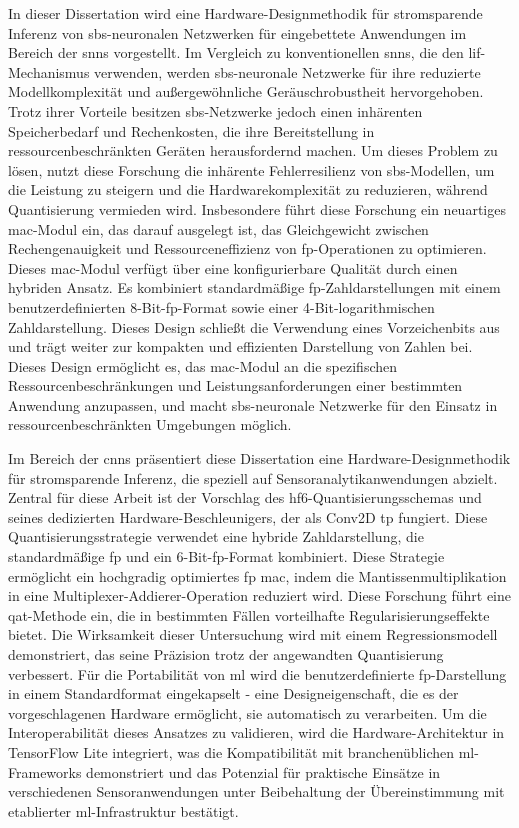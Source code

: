 In dieser Dissertation wird eine Hardware-Designmethodik f\"ur stromsparende Inferenz von \gls{sbs}-neuronalen Netzwerken f\"ur eingebettete Anwendungen im Bereich der \glspl{snn} vorgestellt. Im Vergleich zu konventionellen \glspl{snn}, die den \gls{lif}-Mechanismus verwenden, werden \gls{sbs}-neuronale Netzwerke f\"ur ihre reduzierte Modellkomplexit\"at und au\ss{}ergew\"ohnliche Ger\"auschrobustheit hervorgehoben. Trotz ihrer Vorteile besitzen \gls{sbs}-Netzwerke jedoch einen inh\"arenten Speicherbedarf und Rechenkosten, die ihre Bereitstellung in ressourcenbeschr\"ankten Ger\"aten herausfordernd machen. Um dieses Problem zu l\"osen, nutzt diese Forschung die inh\"arente Fehlerresilienz von \gls{sbs}-Modellen, um die Leistung zu steigern und die Hardwarekomplexit\"at zu reduzieren, w\"ahrend Quantisierung vermieden wird. Insbesondere f\"uhrt diese Forschung ein neuartiges \gls{mac}-Modul ein, das darauf ausgelegt ist, das Gleichgewicht zwischen Rechengenauigkeit und Ressourceneffizienz von \gls{fp}-Operationen zu optimieren. Dieses \gls{mac}-Modul verf\"ugt \"uber eine konfigurierbare Qualit\"at durch einen hybriden Ansatz. Es kombiniert standardm\"a\ss{}ige \gls{fp}-Zahldarstellungen mit einem benutzerdefinierten 8-Bit-\gls{fp}-Format sowie einer 4-Bit-logarithmischen Zahldarstellung. Dieses Design schlie\ss{}t die Verwendung eines Vorzeichenbits aus und tr\"agt weiter zur kompakten und effizienten Darstellung von Zahlen bei. Dieses Design erm\"oglicht es, das \gls{mac}-Modul an die spezifischen Ressourcenbeschr\"ankungen und Leistungsanforderungen einer bestimmten Anwendung anzupassen, und macht \gls{sbs}-neuronale Netzwerke f\"ur den Einsatz in ressourcenbeschr\"ankten Umgebungen m\"oglich.

Im Bereich der \glspl{cnn} pr\"asentiert diese Dissertation eine Hardware-Designmethodik f\"ur stromsparende Inferenz, die speziell auf Sensoranalytikanwendungen abzielt. Zentral f\"ur diese Arbeit ist der Vorschlag des \gls{hf6}-Quantisierungsschemas und seines dedizierten Hardware-Beschleunigers, der als Conv2D \gls{tp} fungiert. Diese Quantisierungsstrategie verwendet eine hybride Zahldarstellung, die standardm\"a\ss{}ige \gls{fp} und ein 6-Bit-\gls{fp}-Format kombiniert. Diese Strategie erm\"oglicht ein hochgradig optimiertes \gls{fp} \gls{mac}, indem die Mantissenmultiplikation in eine Multiplexer-Addierer-Operation reduziert wird. Diese Forschung f\"uhrt eine \gls{qat}-Methode ein, die in bestimmten F\"allen vorteilhafte Regularisierungseffekte bietet. Die Wirksamkeit dieser Untersuchung wird mit einem Regressionsmodell demonstriert, das seine Pr\"azision trotz der angewandten Quantisierung verbessert. F\"ur die Portabilit\"at von \gls{ml} wird die benutzerdefinierte \gls{fp}-Darstellung in einem Standardformat eingekapselt - eine Designeigenschaft, die es der vorgeschlagenen Hardware erm\"oglicht, sie automatisch zu verarbeiten. Um die Interoperabilit\"at dieses Ansatzes zu validieren, wird die Hardware-Architektur in TensorFlow Lite integriert, was die Kompatibilit\"at mit branchen\"ublichen \gls{ml}-Frameworks demonstriert und das Potenzial f\"ur praktische Eins\"atze in verschiedenen Sensoranwendungen unter Beibehaltung der \"Ubereinstimmung mit etablierter \gls{ml}-Infrastruktur best\"atigt.

